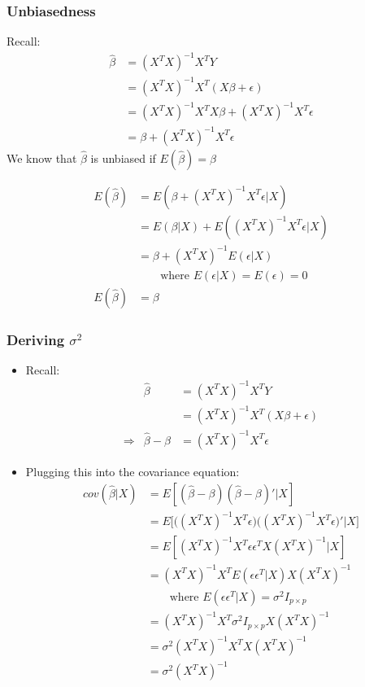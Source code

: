 \documentclass{beamer}
\begin{document}
\begin{frame}[t]\frametitle{Unbiasedness}
	Recall:
	\begin{align*}
	 \hat{\beta} &= (X^{T}X)^{-1}X^{T}Y\\
				 &= (X^{T}X)^{-1}X^{T}(X\beta + \epsilon) \\
				 &= (X^{T}X)^{-1}X^{T}X\beta + (X^{T}X)^{-1}X^{T}\epsilon \\
				 &= \beta + (X^{T}X)^{-1}X^{T}\epsilon 
	\end{align*}
	We know that $\hat{\beta}$ is unbiased if $E (\hat{\beta}) = \beta$

	\[ \begin{array}{rl}
	E (\hat{\beta}) &= E(\beta + (X^{T}X)^{-1}X^{T}\epsilon | X) \\
	 &= E(\beta | X) + E((X^{T}X)^{-1}X^{T}\epsilon | X) \\
	 &= \beta + (X^{T}X)^{-1} E(\epsilon | X) \\
	 &\qquad \text{where } E(\epsilon | X) = E(\epsilon) = 0 \\
	E (\hat{\beta}) &= \beta 
	\end{array} \]
\end{frame}




\begin{frame}[t]\frametitle{Deriving $\sigma^2$}
	\begin{itemize}
		\item<+-> Recall:				
			\[ \begin{array}{rrl} & \hat{\beta} &= (X^{T}X)^{-1}X^{T}Y \nonumber \\
			& &= (X^{T}X)^{-1}X^{T}(X\beta + \epsilon) \\
			\Rightarrow & \hat{\beta} - \beta &= (X^{T}X)^{-1}X^{T} \epsilon
			\end{array} \]
			\item<+-> Plugging this into the covariance equation:
			\[ \begin{array}{rl}
			cov(\hat{\beta} | X) &= E[(\hat{\beta} - \beta)(\hat{\beta} - \beta)'|X] \\
			 &= E\big[ \big((X^{T}X)^{-1}X^{T}\epsilon \big) \big((X^{T}X)^{-1}X^{T}\epsilon)' | X\big] \\
			 &= E[ (X^{T}X)^{-1}X^{T} \epsilon \epsilon^{T}X(X^{T}X)^{-1} | X] \\
			 &= (X^{T}X)^{-1}X^{T} E(\epsilon\epsilon^{T} | X) X(X^{T}X)^{-1}  \\
			 &\qquad \text{where } E(\epsilon\epsilon^{T} | X) = \sigma^{2} I_{p \times p} \\
			 &= (X^{T}X)^{-1}X^{T} \sigma^{2} I_{p \times p} X(X^{T}X)^{-1} \\
			&= \sigma^{2} (X^{T}X)^{-1}X^{T}X(X^{T}X)^{-1} \\
			&= \sigma^{2} (X^{T}X)^{-1}
			\end{array} \]
	\end{itemize}
	\end{frame}
	
\end{document}
